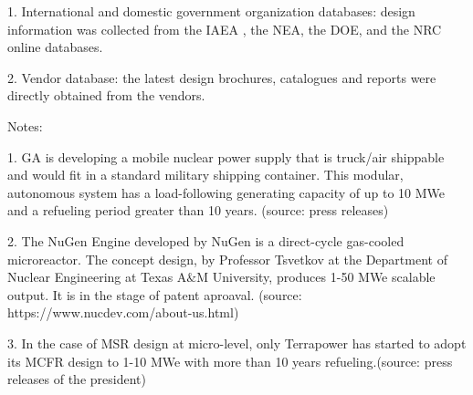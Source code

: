 \documentclass[10pt,a4paper]{article}
\begin{document}
1. International and domestic government organization databases: design information was collected from the \gls{IAEA} , the \gls{NEA}, the \gls{DOE}, and the NRC online databases.

2. Vendor database: the latest design brochures, catalogues and reports were directly obtained from the vendors.

Notes:

1. \gls{GA} is developing a mobile nuclear power supply that is truck/air shippable and would fit in a standard military shipping container. This modular, autonomous system has a load-following generating capacity of up to 10 MWe and a refueling period greater than 10 years. (source: press releases)

2. The NuGen Engine developed by NuGen is a direct-cycle gas-cooled microreactor. The concept design, by Professor Tsvetkov at the Department of Nuclear Engineering at Texas A$\&$M University, produces 1-50 MWe scalable output. It is in the stage of patent aproaval. (source: https://www.nucdev.com/about-us.html)

3. In the case of \gls{MSR} design at micro-level, only Terrapower has started to adopt its \gls{MCFR} design to 1-10 MWe with more than 10 years refueling.(source: press releases of the president) 
\end{document}
